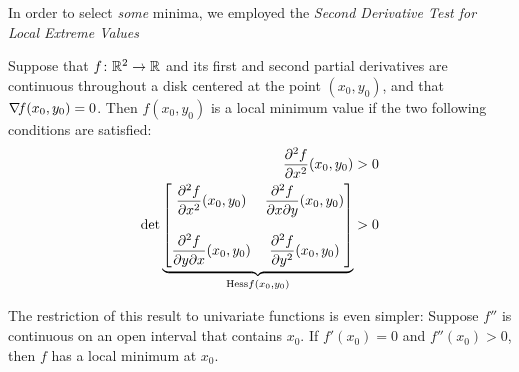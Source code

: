 In order to select \emph{some} minima, we employed the \emph{Second Derivative Test for Local Extreme Values}
\begin{theorem}\label{theorem:2DTforLEV}
Suppose that $f\colon \mathbb{R}^2 \to \mathbb{R}$ and its first and second partial derivatives are continuous throughout a disk centered at the point $(x_0,y_0)$, and that $\mathop{\nabla\! {f}}(x_0,y_0)=0$. Then $f(x_0,y_0)$ is a local minimum value if the two following conditions are satisfied:
\begin{align}
\frac{\partial^2 f}{\partial x^2}(x_0,y_0) &> 0 \\
\det \underbrace{\begin{bmatrix} 
\dfrac{\partial^2 f}{\partial x^2}(x_0,y_0) & \dfrac{\partial^2 f}{\partial x \partial y}(x_0,y_0) \\ & \\
\dfrac{\partial^2 f}{\partial y \partial x}(x_0,y_0) & \dfrac{\partial^2 f}{\partial y^2}(x_0,y_0)
\end{bmatrix}}_{\mathop{\mathrm{Hess}{f}}(x_0,y_0)} &> 0
\end{align}
\end{theorem}

\begin{remark}
The restriction of this result to univariate functions is even simpler: Suppose $f''$ is continuous on an open interval that contains $x_0$.  If $f'(x_0)=0$ and $f''(x_0)>0$, then $f$ has a local minimum at $x_0$. 
\end{remark}


